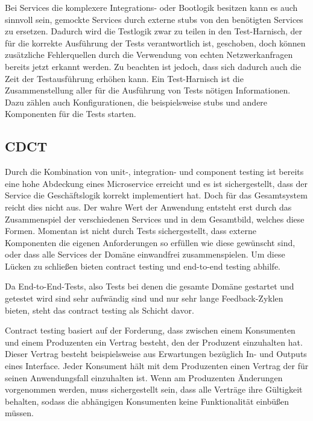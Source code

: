 \documentclass[12pt,a4paper,bibliography=totocnumbered,listof=totocnumbered]{scrartcl}
\begin{document}

Bei Services die komplexere Integrations- oder Bootlogik besitzen kann es auch sinnvoll sein, gemockte Services durch externe stubs von den benötigten Services zu ersetzen. Dadurch wird die Testlogik zwar zu teilen in den Test-Harnisch, der für die korrekte Ausführung der Tests verantwortlich ist, geschoben, doch können zusätzliche Fehlerquellen durch die Verwendung von echten Netzwerkanfragen bereits jetzt erkannt werden. Zu beachten ist jedoch, dass sich dadurch auch die Zeit der Testausführung erhöhen kann.\cite{clemson} Ein Test-Harnisch ist die Zusammenstellung aller für die Ausführung von Tests nötigen Informationen. Dazu zählen auch Konfigurationen, die beispielsweise stubs und andere Komponenten für die Tests starten.

\subsection{\acf{CDCT}}

Durch die Kombination von unit-, integration- und component testing ist bereits eine hohe Abdeckung eines Microservice erreicht und es ist sichergestellt, dass der Service die Geschäftslogik korrekt implementiert hat. Doch für das Gesamtsystem reicht dies nicht aus. Der wahre Wert der Anwendung entsteht erst durch das Zusammenspiel der verschiedenen Services und in dem Gesamtbild, welches diese Formen. Momentan ist nicht durch Tests sichergestellt, dass externe Komponenten die eigenen Anforderungen so erfüllen wie diese gewünscht sind, oder dass alle Services der Domäne einwandfrei zusammenspielen.\cite{clemson} Um diese Lücken zu schließen bieten contract testing und end-to-end testing abhilfe.

Da End-to-End-Tests, also Tests bei denen die gesamte Domäne gestartet und getestet wird sind sehr aufwändig sind und nur sehr lange Feedback-Zyklen bieten, steht das contract testing als Schicht davor.\cite{clemson}

Contract testing basiert auf der Forderung, dass zwischen einem Konsumenten und einem Produzenten ein Vertrag besteht, den der Produzent einzuhalten hat. Dieser Vertrag besteht beispielsweise aus Erwartungen bezüglich In- und Outputs eines Interface. Jeder Konsument hält mit dem Produzenten einen Vertrag der für seinen Anwendungsfall einzuhalten ist. Wenn am Produzenten Änderungen vorgenommen werden, muss sichergestellt sein, dass alle Verträge ihre Gültigkeit behalten, sodass die abhängigen Konsumenten keine Funktionalität einbüßen müssen.\cite{clemson}
\end{document}
